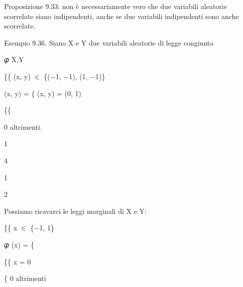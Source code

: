 \documentclass[a4paper,portrait,12pt]{article}
\begin{document}
\begin{flushleft}
Proposizione 9.33: non \`{e} necessariamente vero che due variabili aleatorie scorrelate siano indipendenti, anche se due variabili indipendenti sono anche scorrelate.
\end{flushleft}


\begin{flushleft}
Esempio 9.36. Siano X e Y due variabili aleatorie di legge congiunta
\end{flushleft}





\begin{flushleft}
𝜑 X,Y
\end{flushleft}





\begin{flushleft}
\{\{ (x, y) $\in$ \{($-$1, $-$1), (1, $-$1)\}
\end{flushleft}


\begin{flushleft}
(x, y) = \{ (x, y) = (0, 1)
\end{flushleft}


\{\{


\begin{flushleft}
0 altrimenti.
\end{flushleft}


1


4


1


2





\begin{flushleft}
Possiamo ricavarci le leggi marginali di X e Y:
\end{flushleft}





\begin{flushleft}
\{\{ x $\in$ \{$-$1, 1\}
\end{flushleft}


\begin{flushleft}
𝜑 (x) = \{
\end{flushleft}


\begin{flushleft}
\{\{ x = 0
\end{flushleft}


\begin{flushleft}
\{ 0 altrimenti
\end{flushleft}
\end{document}
